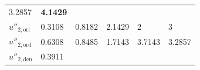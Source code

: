 \begin{longtable}[]{@{}llllll@{}}
\begin{minipage}[t]{0.17\columnwidth}
3.2857\strut
\end{minipage} & \begin{minipage}[t]{0.17\columnwidth}\raggedright
\textbf{4.1429}\strut
\end{minipage}\tabularnewline
\begin{minipage}[t]{0.15\columnwidth}\raggedright
\(u''_{2,\text{ori}}\)\strut
\end{minipage} & \begin{minipage}[t]{0.08\columnwidth}\raggedright
0.3108\strut
\end{minipage} & \begin{minipage}[t]{0.07\columnwidth}\raggedright
0.8182\strut
\end{minipage} & \begin{minipage}[t]{0.20\columnwidth}\raggedright
2.1429\strut
\end{minipage} & \begin{minipage}[t]{0.17\columnwidth}\raggedright
2\strut
\end{minipage} & \begin{minipage}[t]{0.17\columnwidth}\raggedright
3\strut
\end{minipage}\tabularnewline
\begin{minipage}[t]{0.15\columnwidth}\raggedright
\(u''_{2,\text{ord}}\)\strut
\end{minipage} & \begin{minipage}[t]{0.08\columnwidth}\raggedright
0.6308\strut
\end{minipage} & \begin{minipage}[t]{0.07\columnwidth}\raggedright
0.8485\strut
\end{minipage} & \begin{minipage}[t]{0.20\columnwidth}\raggedright
1.7143\strut
\end{minipage} & \begin{minipage}[t]{0.17\columnwidth}\raggedright
3.7143\strut
\end{minipage} & \begin{minipage}[t]{0.17\columnwidth}\raggedright
3.2857\strut
\end{minipage}\tabularnewline
\begin{minipage}[t]{0.15\columnwidth}\raggedright
\(u''_{2,\text{den}}\)\strut
\end{minipage} & \begin{minipage}[t]{0.08\columnwidth}\raggedright
0.3911\strut
\end{minipage} & \begin{minipage}[t]{0.07\columnwidth}\raggedright

\end{minipage}
\end{longtable}
